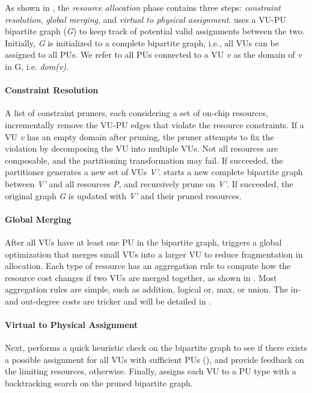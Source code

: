As shown in , the \emph{resource allocation} phase contains three steps:
\emph{constraint resolution}, \emph{global merging}, and \emph{virtual to physical assignment}.
\name uses a VU-PU bipartite graph (\emph{G}) to keep track of potential valid assignments between the two.
Initially, \emph{G} is initialized to a complete bipartite graph, i.e., all VUs can be assigned to
all PUs.
We refer to all PUs connected to a VU \emph{v} as the domain of \emph{v} in G, i.e. \emph{dom(v)}.

\paragraph{Constraint Resolution}
A list of constraint pruners, each considering a set of on-chip resources, 
incrementally remove the VU-PU edges that violate the resource constraints.
If a VU \emph{v} has an empty domain after pruning, the pruner attempts to fix the violation by
decomposing the VU into multiple VUs. 
Not all resources are composable, and the partitioning transformation may fail.
If succeeded, the partitioner generates a new set of VUs \emph{V'}. \name starts a new complete bipartite
graph between \emph{V'} and all resources \emph{P}, and recursively prune on \emph{V'}.
If succeeded, the original graph \emph{G} is updated with \emph{V'} and their pruned resources.

\paragraph{Global Merging}
After all VUs have at least one PU in the bipartite graph, \name triggers a global optimization that merges 
small VUs into a larger VU to reduce fragmentation in allocation.
Each type of resource has an aggregation rule to compute how the resource cost changes if two VUs are merged
together, as shown in . 
Most aggregation rules are simple, such as addition, logical or, max, or union.
The in- and out-degree costs are tricker and will be detailed in .

\paragraph{Virtual to Physical Assignment}
Next, \name performs a quick heuristic check on the bipartite graph to see if there exists a
possible assignment for all VUs with sufficient PUs (), and provide feedback on the limiting resources, otherwise.
Finally, \name assigns each VU to a PU type with a backtracking search on the pruned bipartite
graph.

